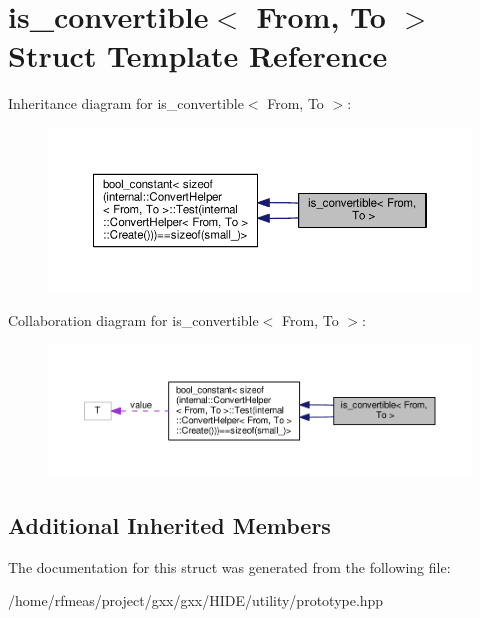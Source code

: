 \hypertarget{structis__convertible}{}\section{is\+\_\+convertible$<$ From, To $>$ Struct Template Reference}
\label{structis__convertible}


Inheritance diagram for is\+\_\+convertible$<$ From, To $>$\+:
\nopagebreak
\begin{figure}[H]
\begin{center}
\leavevmode
\includegraphics[width=350pt]{structis__convertible__inherit__graph}
\end{center}
\end{figure}


Collaboration diagram for is\+\_\+convertible$<$ From, To $>$\+:
\nopagebreak
\begin{figure}[H]
\begin{center}
\leavevmode
\includegraphics[width=350pt]{structis__convertible__coll__graph}
\end{center}
\end{figure}
\subsection*{Additional Inherited Members}


The documentation for this struct was generated from the following file\+:\begin{DoxyCompactItemize}
\item 
/home/rfmeas/project/gxx/gxx/\+H\+I\+D\+E/utility/prototype.\+hpp\end{DoxyCompactItemize}

